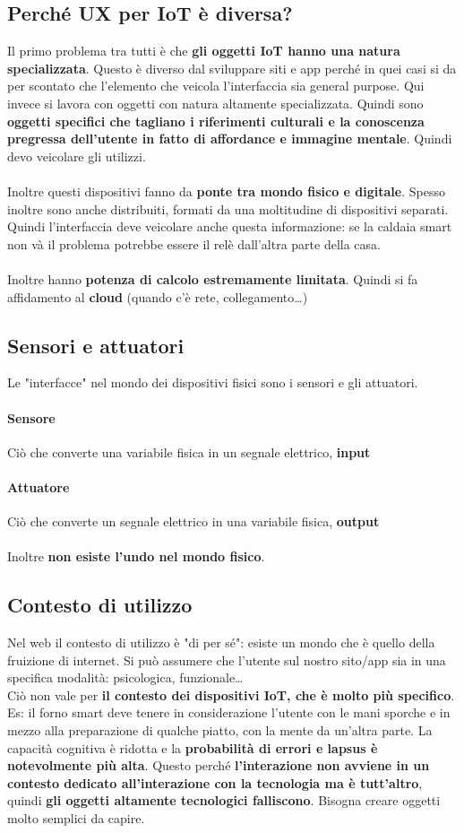 \documentclass[10pt]{article}
\begin{document}
\subsection{Perché UX per IoT è diversa?}
Il primo problema tra tutti è che \textbf{gli oggetti IoT hanno una natura specializzata}. Questo è diverso dal sviluppare siti e app perché in quei casi si da per scontato che l'elemento che veicola l'interfaccia sia general purpose. Qui invece si lavora con oggetti con natura altamente specializzata. Quindi sono \textbf{oggetti specifici che tagliano i riferimenti culturali e la conoscenza pregressa dell'utente in fatto di affordance e immagine mentale}. Quindi devo veicolare gli utilizzi.\\\\
Inoltre questi dispositivi fanno da \textbf{ponte tra mondo fisico e digitale}. Spesso inoltre sono anche distribuiti, formati da una moltitudine di dispositivi separati. Quindi l'interfaccia deve veicolare anche questa informazione: se la caldaia smart non và il problema potrebbe essere il relè dall'altra parte della casa.\\\\
Inoltre hanno \textbf{potenza di calcolo estremamente limitata}. Quindi si fa affidamento al \textbf{cloud} (quando c'è rete, collegamento\ldots)
\subsection{Sensori e attuatori}
Le "interfacce" nel mondo dei dispositivi fisici sono i sensori e gli attuatori.
\paragraph{Sensore} Ciò che converte una variabile fisica in un segnale elettrico, \textbf{input}
\paragraph{Attuatore} Ciò che converte un segnale elettrico in una variabile fisica, \textbf{output}
\paragraph{} Inoltre \textbf{non esiste l'undo nel mondo fisico}.
\subsection{Contesto di utilizzo}
Nel web il contesto di utilizzo è "di per sé": esiste un mondo che è quello della fruizione di internet. Si può assumere che l'utente sul nostro sito/app sia in una specifica modalità: psicologica, funzionale\ldots\\
Ciò non vale per \textbf{il contesto dei dispositivi IoT, che è molto più specifico}. Es: il forno smart deve tenere in considerazione l'utente con le mani sporche e in mezzo alla preparazione di qualche piatto, con la mente da un'altra parte. La capacità cognitiva è ridotta e la \textbf{probabilità di errori e lapsus è notevolmente più alta}. Questo perché \textbf{l'interazione non avviene in un contesto dedicato all'interazione con la tecnologia ma è tutt'altro}, quindi \textbf{gli oggetti altamente tecnologici falliscono}. Bisogna creare oggetti molto semplici da capire.
\end{document}
